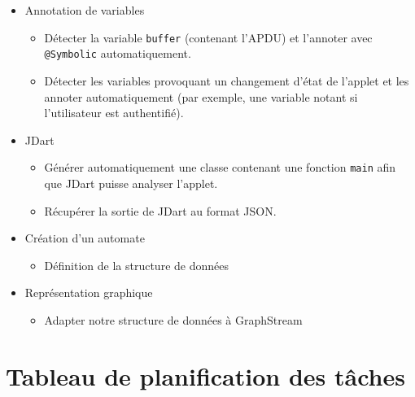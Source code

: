 \begin{itemize}
\item Annotation de variables
  \begin{itemize}
  \item Détecter la variable \verb|buffer| (contenant l'\gls{APDU}) et l'annoter avec \verb|@Symbolic| automatiquement.
  \item Détecter les variables provoquant un changement d'état de l'applet et les annoter automatiquement (par exemple, une variable notant si l'utilisateur est authentifié).
  \end{itemize}
\item JDart
  \begin{itemize}
  \item Générer automatiquement une classe contenant une fonction \verb|main| afin que JDart puisse analyser l'applet.
  \item Récupérer la sortie de JDart au format JSON.
  \end{itemize}
\item Création d'un automate
  \begin{itemize}
  \item Définition de la structure de données
  \end{itemize}
\item Représentation graphique
  \begin{itemize}
  \item Adapter notre structure de données à GraphStream
  \end{itemize}
\end{itemize}

\section{Tableau de planification des tâches}

\shorthandoff{:!}

